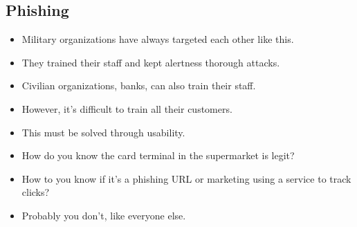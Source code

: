 \subsection{Phishing}

\begin{frame}
  \begin{remark}
    \begin{itemize}
      \item Military organizations have always targeted each other like this.
      \item They trained their staff and kept alertness thorough attacks.

        \pause

      \item Civilian organizations, \eg banks, can also train their staff.

        \pause

      \item However, it's difficult to train all their customers.
      \item This must be solved through usability.
    \end{itemize}
  \end{remark}
\end{frame}

\begin{frame}
  \begin{question}
    \begin{itemize}
      \item How do you know the card terminal in the supermarket is legit?
      \item How to you know if it's a phishing URL or marketing using a service 
        to track clicks?
    \end{itemize}
  \end{question}

  \begin{remark}
    \begin{itemize}
      \item Probably you don't, like everyone else.
    \end{itemize}
  \end{remark}
\end{frame}

